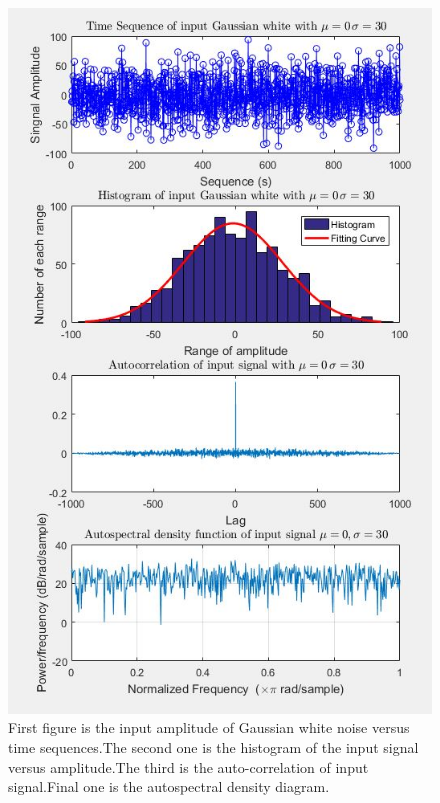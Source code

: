 \documentclass[12pt,a4paper]{article}
\begin{document}
			\begin{figure}[H]
				\centering
				\includegraphics[scale=0.8]{Problem2e}
				\caption[Properties of the Gaussian white input]{First figure is the input amplitude of Gaussian white noise versus time sequences.The second one is the histogram of the input signal versus amplitude.The third is the auto-correlation of input signal.Final one is the autospectral density diagram.}
			\end{figure}
\end{document}
